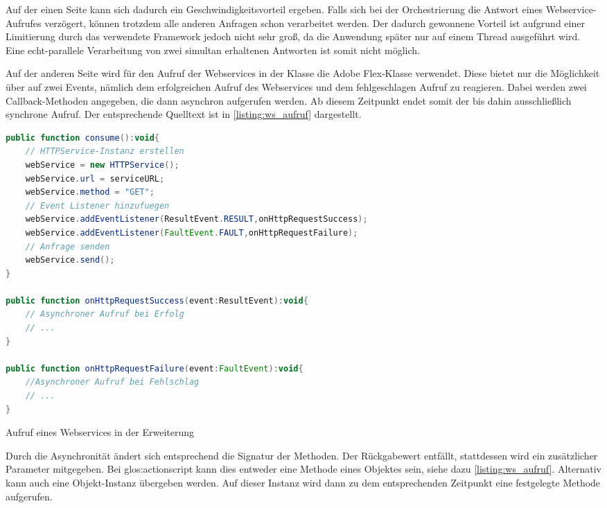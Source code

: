 \begin{onehalfspacing}
Auf der einen Seite kann sich dadurch ein Geschwindigkeitsvorteil ergeben. Falls sich bei der Orchestrierung die Antwort eines Webservice-Aufrufes verzögert, können trotzdem alle anderen Anfragen schon verarbeitet werden. Der dadurch gewonnene Vorteil ist aufgrund einer Limitierung durch das verwendete Framework jedoch nicht sehr groß, da die Anwendung später nur auf einem Thread ausgeführt wird. Eine echt-parallele Verarbeitung von zwei simultan erhaltenen Antworten ist somit nicht möglich.

Auf der anderen Seite wird für den Aufruf der Webservices in der Klasse  die Adobe Flex-Klasse  verwendet. Diese bietet nur die Möglichkeit über  auf zwei Events, nämlich dem erfolgreichen Aufruf des Webservices und dem fehlgeschlagen Aufruf zu reagieren. Dabei werden zwei Callback-Methoden angegeben, die dann asynchron aufgerufen werden. Ab diesem Zeitpunkt endet somit der bis dahin ausschließlich synchrone Aufruf. Der entsprechende Quelltext ist in \vref{listing:ws_aufruf} dargestellt.

\begin{programm}[ht]
\begin{lstlisting}[language=ActionScript]
public function consume():void{
	// HTTPService-Instanz erstellen
	webService = new HTTPService();
	webService.url = serviceURL;     
	webService.method = "GET";
	// Event Listener hinzufuegen
	webService.addEventListener(ResultEvent.RESULT,onHttpRequestSuccess);
	webService.addEventListener(FaultEvent.FAULT,onHttpRequestFailure);
	// Anfrage senden
	webService.send();
}
		
public function onHttpRequestSuccess(event:ResultEvent):void{
	// Asynchroner Aufruf bei Erfolg
	// ...
}
		
public function onHttpRequestFailure(event:FaultEvent):void{
	//Asynchroner Aufruf bei Fehlschlag
	// ...
}
\end{lstlisting}
\caption{Aufruf eines Webservices in der Erweiterung\label{listing:ws_aufruf}}
\end{programm}

Durch die Asynchronität ändert sich entsprechend die Signatur der Methoden. Der Rückgabewert entfällt, stattdessen wird ein zusätzlicher Parameter mitgegeben. Bei \gls{glos:actionscript} kann dies entweder eine Methode eines Objektes sein, siehe dazu \vref{listing:ws_aufruf}. Alternativ kann auch eine Objekt-Instanz übergeben werden. Auf dieser Instanz wird dann zu dem entsprechenden Zeitpunkt eine festgelegte Methode aufgerufen.


\end{onehalfspacing}
